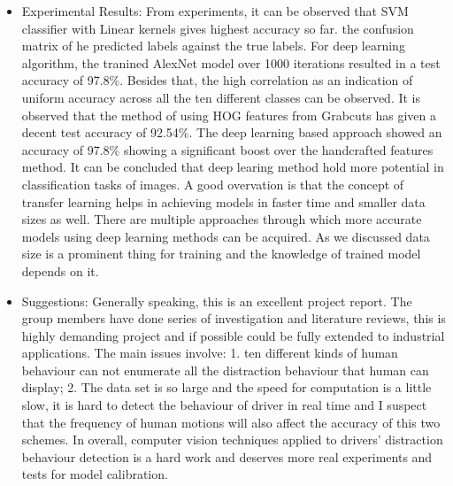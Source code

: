 \documentclass[letterpaper]{article}
\begin{document}
\begin{itemize}
	\item Experimental Results: From experiments, it can be observed that SVM classifier with Linear kernels gives highest accuracy so far. the confusion matrix of he predicted labels against the true labels. For deep learning algorithm, the tranined AlexNet model over 1000 iterations resulted in a test accuracy of 97.8$\%$. Besides that, the high correlation as an indication of uniform accuracy across all the ten different classes can be observed. It is observed that the method of using HOG features from Grabcuts has given a decent test accuracy of 92.54$\%$. The deep learning based approach showed an accuracy of 97.8$\%$ showing a significant boost over the handcrafted features method. It can be concluded that deep learing method hold more potential in classification tasks of images. A good overvation is that the concept of transfer learning helps in achieving models in faster time and smaller data sizes as well. There are multiple approaches through which more accurate models using deep learning methods can be acquired. As we discussed data size is a prominent thing for training and the knowledge of trained model depends on it. 
	\item Suggestions: Generally speaking, this is an excellent project report. The group members have done series of investigation and literature reviews, this is highly demanding project and if possible could be fully extended to industrial applications. The main issues involve: 1. ten different kinds of human behaviour can not enumerate all the distraction behaviour that human can display; 2. The data set is so large and the speed for computation is a little slow, it is hard to detect the behaviour of driver in real time and I suspect that the frequency of human motions will also affect the accuracy of this two schemes. In overall, computer vision techniques applied to drivers' distraction behaviour detection is a hard work and deserves more real experiments and tests for model calibration.
\end{itemize}
\end{document}
